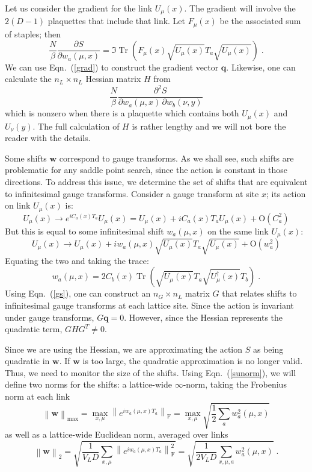 \documentclass[preprint,aps,prd]{revtex4-2}
\newcommand{\da}{\dagger}  %
\newcommand{\be}{\begin{equation}}
\newcommand{\eq}{\end{equation}}
\DeclareMathOperator{\Tr}{Tr}
\newcommand\fnorm[1]{\left\lVert #1 \right\rVert_\mathrm{F}}
\begin{document}
Let us consider the gradient for the link $U_\mu(x)$.
The gradient will involve the $2 (D-1)$ plaquettes that include that link.
Let $F_\mu(x)$ be the associated sum of staples; then
\be
   \frac{N}{\beta} \frac{\partial S}{\partial w_a(\mu, x)} =
   \Im\Tr\left(F_\mu(x) \sqrt{U_\mu(x)} T_a \sqrt{U_\mu(x)}\right) \; .
   \label{grad}
\eq
We can use Eqn.~(\ref{grad}) to construct the gradient vector $\mathbf{q}$.
Likewise, one can calculate the $n_L\times n_L$ Hessian matrix
$H$ from
\be
      \frac{N}{\beta} \frac{\partial^2 S}{\partial w_a(\mu, x)\, \partial w_b(\nu, y)}
\eq
which is nonzero when there is a plaquette which contains both
$U_\mu(x)$ and $U_\nu(y)$.
The full calculation of $H$ is rather lengthy and we will not bore the reader
with the details.

Some shifts $\mathbf{w}$ correspond to gauge transforms.
As we shall see, such shifts are problematic for any saddle
point search, since the action is constant in those directions.
To address this issue, we determine the set of shifts that are
equivalent to infinitesimal gauge transforms.  Consider a gauge transform
at site $x$; its action on link $U_\mu(x)$ is:
\be
U_\mu(x) \to e^{i C_a(x) T_a} U_\mu(x) = U_\mu(x) + i C_a(x) T_a U_\mu(x) +
       \mathrm{O}\!\left(C_a^2\right)
\eq
But this is equal to some infinitesimal shift $w_a(\mu, x)$ on
the same link $U_\mu(x)$:
\be
U_\mu(x) \to U_\mu(x) + i w_a(\mu,x) \sqrt{U_\mu(x)}T_a \sqrt{U_\mu(x)} +
       \mathrm{O}\!\left(w_a^2\right)
\eq
%
Equating the two and taking the trace:
\be
w_a(\mu,x) = 2 C_b(x) \Tr\left(\sqrt{U_\mu(x)} T_a
                     \sqrt{U_\mu^\da(x)} T_b\right) \; . \label{gs}
\eq
Using Eqn.~(\ref{gs}), one can construct an $n_G \times n_L$ matrix
$G$ that relates shifts to infinitesimal gauge transforms
at each lattice site.
Since the action is invariant under gauge transforms, $G \mathbf{q} = 0$.
However, since the Hessian represents the quadratic term, $G H G^T \neq 0$.

Since we are using the Hessian, we are approximating
the action $S$ as being quadratic in $\mathbf{w}$.  If $\mathbf{w}$
is too large, the quadratic approximation is no longer valid.
Thus, we need to monitor the size of the shifts.
Using Eqn.~(\ref{sunorm}), we will define two norms for the shifts:
a lattice-wide $\infty$-norm, taking the Frobenius norm at each link
\be
\left\lVert \mathbf{w}\right\rVert_{\mathrm{max}} =
     \max_{x,\mu} \fnorm{e^{i w_{a}(\mu, x) T_a}}
     = \max_{x,\mu} \sqrt{\frac{1}{2}\sum_a w_a^2(\mu, x)}
\eq
as well as a lattice-wide Euclidean norm, averaged over links
\be
\left\lVert \mathbf{w}\right\rVert_2 =
      \sqrt{\frac{1}{V_L D} \sum_{x, \mu}
        \fnorm{e^{i w_{a}(\mu, x) T_a}}^2}
     = \sqrt{\frac{1}{2 V_L D} \sum_{x, \mu, a} w_a^2(\mu, x)}
        \; .  \label{shiftsize}
\eq
\end{document}
